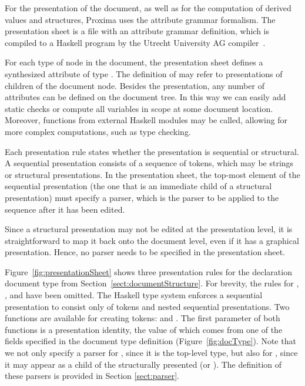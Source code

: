 \documentclass[12pt]{article}
\begin{document}
For the presentation of the document, as well as for the computation of derived values and structures, Proxima uses the attribute grammar formalism. The presentation sheet is a file with an attribute grammar definition, which is compiled to a Haskell program by the Utrecht University AG compiler~\cite{swierstra08ag}.

For each type of node in the document, the presentation sheet defines a synthesized attribute  of type . The definition of  may refer to presentations of children of the document node. Besides the presentation, any number of attributes can be defined on the document tree. In this way we can easily add static checks or compute all variables in scope at some document location. Moreover, functions from external Haskell modules may be called, allowing for more complex computations, such as type checking.


Each presentation rule states whether the presentation is sequential or structural. A sequential presentation consists of a sequence of tokens, which may be strings or structural presentations. In the presentation sheet, the top-most element of the sequential presentation (the one that is an immediate child of a structural presentation) must specify a parser, which is the parser to be applied to the sequence after it has been edited.

Since a structural presentation may not be edited at the presentation level, it is straightforward to map it back onto the document level, even if it has a graphical presentation. Hence, no parser needs to be specified in the presentation sheet.

Figure~\ref{fig:presentationSheet} shows three presentation rules for the declaration document type from Section~\ref{sect:documentStructure}. For brevity, the rules for , , and  have been omitted. The Haskell type system enforces a sequential presentation to consist only of tokens and nested sequential presentations. Two functions are available for creating tokens:  and . The first parameter of both functions is a presentation identity, the value of which comes from one of the  fields specified in the document type definition (Figure~\ref{fig:docType}). Note that we not only specify a parser for , since it is the top-level type, but also for , since it may appear as a child of the structurally presented  (or ). The definition of these parsers is provided in Section \ref{sect:parser}.
\end{document}
